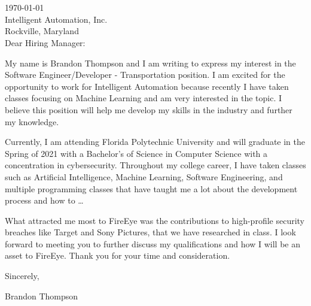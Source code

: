 \documentclass{resume} %
\begin{document}

\begin{rSection}{}
\ \\\
\\
\today \\
Intelligent Automation, Inc.\\
Rockville, Maryland\\


Dear Hiring Manager:

My name is Brandon Thompson and I am writing to express my interest in the Software Engineer/Developer - Transportation position.
I am excited for the opportunity to work for Intelligent Automation because recently I have taken classes focusing on Machine Learning and am very interested in the topic.
I believe this position will help me develop my skills in the industry and further my knowledge.

Currently, I am attending Florida Polytechnic University and will graduate in the Spring of 2021 with a Bachelor's of Science in Computer Science with a concentration in cybersecurity.
Throughout my college career, I have taken classes such as Artificial Intelligence, Machine Learning, Software Engineering, and multiple programming classes that have taught me a lot about the development process and how to \dots

What attracted me most to FireEye was the contributions to high-profile security breaches like Target and Sony Pictures, that we have researched in class.
I look forward to meeting you to further discuss my qualifications and how I will be an asset to FireEye.
Thank you for your time and consideration.


Sincerely,

Brandon Thompson


\end{rSection}
\end{document}
